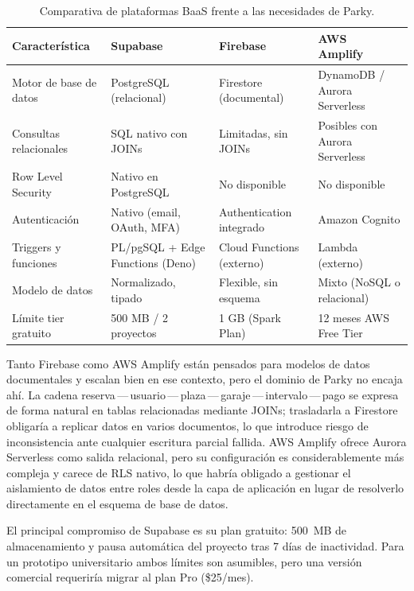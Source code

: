 \begin{table}[htbp]
  \centering
  \caption{Comparativa de plataformas BaaS frente a las necesidades de Parky.}
  \label{tab:baas-comparativa}
  \begin{tabularx}{\textwidth}{lXXX}
    \toprule
    \textbf{Característica} & \textbf{Supabase}~\cite{supabase2024}
                            & \textbf{Firebase}~\cite{firebase2024}
                            & \textbf{AWS Amplify}~\cite{awsamplify2024} \\
    \midrule
    Motor de base de datos  & PostgreSQL (relacional)
                            & Firestore (documental)
                            & DynamoDB / Aurora Serverless               \\
    Consultas relacionales  & SQL nativo con JOINs
                            & Limitadas, sin JOINs
                            & Posibles con Aurora Serverless             \\
    Row Level Security      & Nativo en PostgreSQL
                            & No disponible
                            & No disponible                              \\
    Autenticación           & Nativo (email, OAuth, MFA)
                            & Authentication integrado
                            & Amazon Cognito                             \\
    Triggers y funciones    & PL/pgSQL + Edge Functions (Deno)
                            & Cloud Functions (externo)
                            & Lambda (externo)                           \\
    Modelo de datos         & Normalizado, tipado
                            & Flexible, sin esquema
                            & Mixto (NoSQL o relacional)                 \\
    Límite tier gratuito    & 500 MB / 2 proyectos
                            & 1 GB (Spark Plan)
                            & 12 meses AWS Free Tier                     \\
    \bottomrule
  \end{tabularx}
\end{table}

Tanto Firebase como AWS Amplify están pensados para modelos de datos documentales y escalan bien en ese contexto, pero el dominio de Parky no encaja ahí. La cadena reserva\,---\,usuario\,---\,plaza\,---\,garaje\,---\,intervalo\,---\,pago se expresa de forma natural en tablas relacionadas mediante JOINs; trasladarla a Firestore obligaría a replicar datos en varios documentos, lo que introduce riesgo de inconsistencia ante cualquier escritura parcial fallida. AWS Amplify ofrece Aurora Serverless como salida relacional, pero su configuración es considerablemente más compleja y carece de RLS nativo, lo que habría obligado a gestionar el aislamiento de datos entre roles desde la capa de aplicación en lugar de resolverlo directamente en el esquema de base de datos.

El principal compromiso de Supabase es su plan gratuito: 500~MB de almacenamiento y pausa automática del proyecto tras 7 días de inactividad. Para un prototipo universitario ambos límites son asumibles, pero una versión comercial requeriría migrar al plan Pro (\$25/mes).